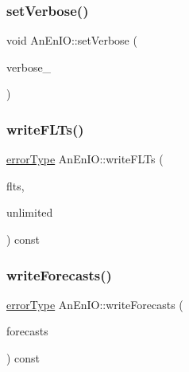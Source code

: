 \subsubsection{\texorpdfstring{set\+Verbose()}{setVerbose()}}
{\footnotesize\ttfamily void An\+En\+I\+O\+::set\+Verbose (\begin{DoxyParamCaption}\item[{int}]{verbose\+\_\+ }\end{DoxyParamCaption})}

\mbox{\label{class_an_en_i_o_a150e3fc6fe249b11bac909e5ee843a58}} 
\subsubsection{\texorpdfstring{write\+F\+L\+Ts()}{writeFLTs()}}
{\footnotesize\ttfamily \mbox{\hyperlink{class_an_en_i_o_aa56bc1ec6610b86db4349bce20f9ead0}{error\+Type}} An\+En\+I\+O\+::write\+F\+L\+Ts (\begin{DoxyParamCaption}\item[{const \mbox{\hyperlink{classanen_time_1_1_f_l_ts}{anen\+Time\+::\+F\+L\+Ts}} \&}]{flts,  }\item[{bool}]{unlimited }\end{DoxyParamCaption}) const}

\mbox{\label{class_an_en_i_o_abc5b12bc4692f3ac303fa5430aecaf4c}} 
\subsubsection{\texorpdfstring{write\+Forecasts()}{writeForecasts()}}
{\footnotesize\ttfamily \mbox{\hyperlink{class_an_en_i_o_aa56bc1ec6610b86db4349bce20f9ead0}{error\+Type}} An\+En\+I\+O\+::write\+Forecasts (\begin{DoxyParamCaption}\item[{const \mbox{\hyperlink{class_forecasts}{Forecasts}} \&}]{forecasts }\end{DoxyParamCaption}) const}

\mbox{\label{class_an_en_i_o_ae89350e02d93439e79aa76068062490a}} 
